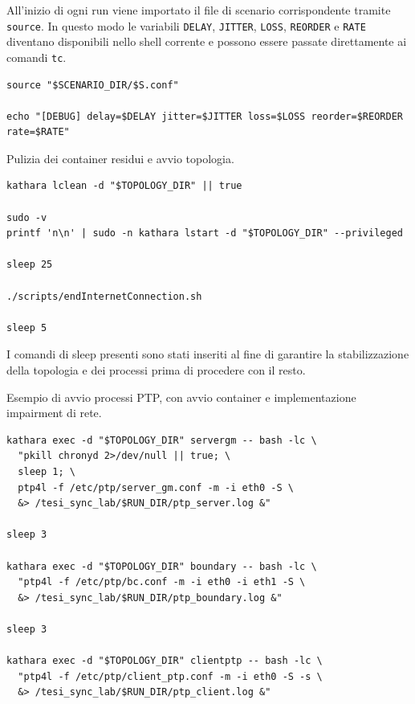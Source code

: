 All'inizio di ogni run viene importato il file di scenario corrispondente
tramite \texttt{source}. In questo modo le variabili \texttt{DELAY}, \texttt{JITTER},
\texttt{LOSS}, \texttt{REORDER} e \texttt{RATE} diventano disponibili nello
shell corrente e possono essere passate direttamente ai comandi \texttt{tc}.

\begin{listing}[H]
\begin{verbatim}
source "$SCENARIO_DIR/$S.conf"

echo "[DEBUG] delay=$DELAY jitter=$JITTER loss=$LOSS reorder=$REORDER rate=$RATE"
\end{verbatim}
\caption{Importazione dei parametri dello scenario corrente.}
\label{lst:auto-source-scenario}
\end{listing}

Pulizia dei container residui e avvio topologia.

\begin{listing}[H]
\begin{verbatim}
kathara lclean -d "$TOPOLOGY_DIR" || true

sudo -v
printf 'n\n' | sudo -n kathara lstart -d "$TOPOLOGY_DIR" --privileged

sleep 25

./scripts/endInternetConnection.sh

sleep 5
\end{verbatim}
\caption{Pulizia e avvio della topologia prima di una run.}
\label{lst:auto-lstart}
\end{listing}

I comandi di sleep presenti sono stati inseriti al fine di garantire la stabilizzazione
della topologia e dei processi prima di procedere con il resto.

Esempio di avvio processi PTP, con avvio container e implementazione impairment
di rete.

\begin{listing}[H]
\begin{verbatim}
kathara exec -d "$TOPOLOGY_DIR" servergm -- bash -lc \
  "pkill chronyd 2>/dev/null || true; \
  sleep 1; \
  ptp4l -f /etc/ptp/server_gm.conf -m -i eth0 -S \
  &> /tesi_sync_lab/$RUN_DIR/ptp_server.log &"

sleep 3

kathara exec -d "$TOPOLOGY_DIR" boundary -- bash -lc \
  "ptp4l -f /etc/ptp/bc.conf -m -i eth0 -i eth1 -S \
  &> /tesi_sync_lab/$RUN_DIR/ptp_boundary.log &"

sleep 3

kathara exec -d "$TOPOLOGY_DIR" clientptp -- bash -lc \
  "ptp4l -f /etc/ptp/client_ptp.conf -m -i eth0 -S -s \
  &> /tesi_sync_lab/$RUN_DIR/ptp_client.log &"
\end{verbatim}
\caption{Avvio dei processi PTP nella run automatizzata.}
\label{lst:auto-ptp-start}
\end{listing}

